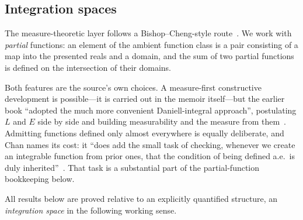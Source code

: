 \documentclass[11pt]{article}
\theoremstyle{definition}
\theoremstyle{remark}
\begin{document}
\subsection{Integration spaces}
\label{sec:intspace}
The measure-theoretic layer follows a Bishop--Cheng-style route~\cite{bishop-cheng-1972}.  We work with \emph{partial} functions: an element of the ambient function class is a pair consisting of a map into the presented reals and a domain, and the sum of two partial functions is defined on the intersection of their domains.

Both features are the source's own choices.  A measure-first constructive development is possible---it is carried out in the memoir itself---but the earlier book ``adopted the much more convenient Daniell-integral approach'', postulating $L$ and $E$ side by side and building measurability and the measure from them~\cite[\S13.1.2]{chan-2023}.  Admitting functions defined only almost everywhere is equally deliberate, and Chan names its cost: it ``does add the small task of checking, whenever we create an integrable function from prior ones, that the condition of being defined a.e.\ is duly inherited''~\cite[\S13.1.2]{chan-2023}.  That task is a substantial part of the partial-function bookkeeping below.

All results below are proved relative to an explicitly quantified structure, an \emph{integration space} in the following working sense.
\end{document}
